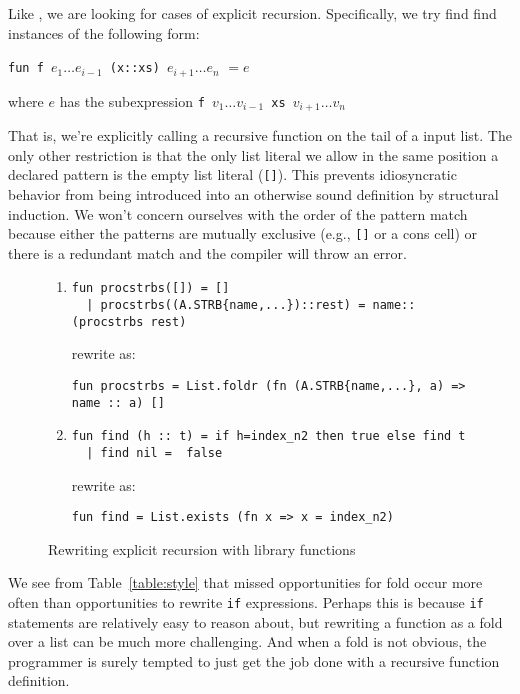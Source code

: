 \documentclass[12pt,abstracton]{scrartcl}
\begin{document}
Like \cite{Jeu13}, we are looking for cases of explicit recursion. Specifically, we try find
find instances of the following form:
\begin{center}
\texttt{fun f }\(e_{1}\ldots e_{i-1}\)\texttt{ (x::xs) }\(e_{i+1}\ldots e_{n}\) \(= e\)

where $e$ has the subexpression \texttt{f }\(v_{1}\ldots v_{i-1}\)\texttt{ xs }\(v_{i+1}\ldots v_{n}\)
\end{center}
That is, we're explicitly calling a recursive function on the tail of a input list.
The only other restriction is that the only list literal we allow in the same position
a declared pattern is the empty list literal (\texttt{[]}). This prevents idiosyncratic
behavior from being introduced into an otherwise sound definition by structural induction.
We won't concern ourselves with the order of the pattern match because either the patterns
are mutually exclusive (e.g., \texttt{[]} or a cons cell) or there is a redundant match
and the compiler will throw an error.

\begin{figure}[h!]
\begin{enumerate}
\item \begin{verbatim}
fun procstrbs([]) = []
  | procstrbs((A.STRB{name,...})::rest) = name::(procstrbs rest)
\end{verbatim}

rewrite as:
\begin{verbatim}
fun procstrbs = List.foldr (fn (A.STRB{name,...}, a) => name :: a) []
\end{verbatim}
\item \begin{verbatim}
fun find (h :: t) = if h=index_n2 then true else find t
  | find nil =  false
\end{verbatim}

rewrite as:
\begin{verbatim}
fun find = List.exists (fn x => x = index_n2)
\end{verbatim}
\end{enumerate}
\caption{Rewriting explicit recursion with library functions}
\label{figure:fold}
\end{figure}

We see from Table~\ref{table:style} that missed opportunities for fold occur more often
than opportunities to rewrite \texttt{if} expressions. Perhaps this is
because \texttt{if} statements are relatively easy to reason about, but
rewriting a function as a fold over a list can be much more challenging.
And when a fold is not obvious, the programmer is surely tempted to just
get the job done with a recursive function definition.
\end{document}
